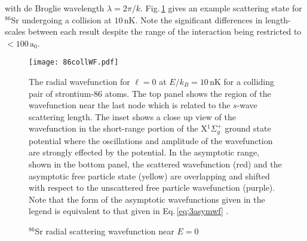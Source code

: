 with de Broglie wavelength $\lambda = 2\pi/k$.
Fig.\,\ref{fig:longRange} gives an example scattering state for $^{86}$Sr undergoing a collision at $10$\,nK.
Note the significant differences in length-scales between each result despite the range of the interaction being restricted to $<\!100\,\text{a}_0$.
\begin{figure} 
	\centerline{
	\texttt{[image: 86collWF.pdf]}}
	\caption{$^{86}$Sr radial scattering wavefunction near $E=0$}{The radial wavefunction for $\ell=0$ at $E/k_B=10\,$nK for a colliding pair of strontium-86 atoms. The top panel shows the region of the wavefunction near the last node which is related to the $s$-wave scattering length. The inset shows a close up view of the wavefunction in the short-range portion of the X$^1\Sigma_g^+$ ground state potential where the oscillations and amplitude of the wavefunction are strongly effected by the potential. In the asymptotic range, shown in the bottom panel, the scattered wavefunction (red) and the asymptotic free particle state (yellow) are overlapping and shifted with respect to the unscattered free particle wavefunction (purple). Note that the form of the asymptotic wavefunctions given in the legend is equivalent to that given in Eq.\,\ref{eq:3asymwf} \cite{Alexander2014, Sakurai2010}.}
	 \label{fig:longRange}
\end{figure} 


